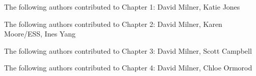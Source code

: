 \noindent The following authors contributed to Chapter 1: David Milner, Katie Jones

\noindent The following authors contributed to Chapter 2: David Milner, Karen Moore/ESS, Ines Yang

\noindent The following authors contributed to Chapter 3: David Milner, Scott Campbell

\noindent The following authors contributed to Chapter 4: David Milner, Chloe Ormorod
